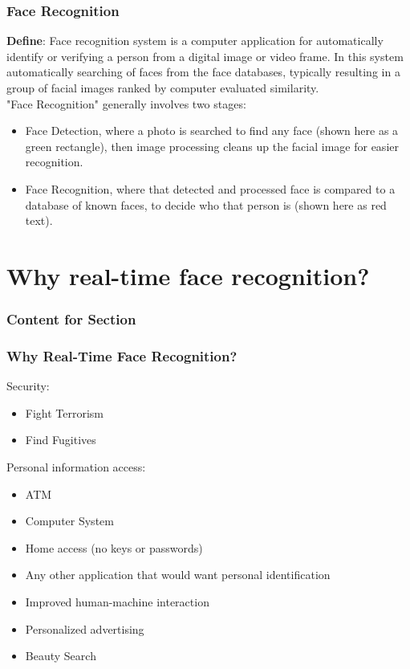 \documentclass[xcolor=dvipsnames]{beamer}
\begin{document}
    \begin{frame}
    \frametitle{Face Recognition}
    \textbf{Define}: Face recognition system is a computer application for automatically identify or verifying a person from a digital image or video frame. In this system automatically searching of faces from the face databases, typically resulting in a group of facial images ranked by computer evaluated similarity.\\
    "Face Recognition" generally involves two stages:
    \begin{itemize}
    \item Face Detection, where a photo is searched to find any face (shown here as a green rectangle), then image processing cleans up the facial image for easier recognition.
    \item Face Recognition, where that detected and processed face is compared to a database of known faces, to decide who that person is (shown here as red text).
    \end{itemize}
    \end{frame}


    \section{Why real-time face recognition?}
    \begin{frame}
      \frametitle{Content for Section \thesection}
      \tableofcontents[currentsection]
    \end{frame}

    \begin{frame}
    \frametitle{Why Real-Time Face Recognition?}
    
    \begin{block}{Security:}
    \begin{itemize}
    \item Fight Terrorism
    \item Find Fugitives
    \end{itemize}
    \end{block}
    
    \begin{block}{Personal information access:}
    \begin{itemize}
    \item ATM
    \item Computer System
    \item Home access (no keys or passwords)
    \item Any other application that would want personal identification
    \end{itemize}
    \end{block}
    
    \begin{itemize}
    \item Improved human-machine interaction
    \item Personalized advertising
    \item Beauty Search
    \end{itemize}
    \end{frame}
\end{document}
